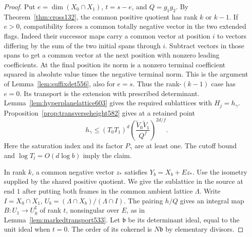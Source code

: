 \documentclass[a4paper,11pt]{article}
\theoremstyle{definition}
\theoremstyle{remark}
\numberwithin{equation}{section}
\begin{document}
\begin{proof}
Put \(e=\dim(X_0\cap X_1)\), \(t=s-e\), and \(Q=g_1g_2\).
By Theorem~\ref{thm:cross132}, the common positive quotient has
rank \(k\) or \(k-1\). If \(e>0\), compatibility forces a common
totally negative vector in the two extended flags. Indeed their
successor maps carry a common vector at position \(i\) to vectors
differing by the sum of the two initial spans through \(i\).
Subtract vectors in those spans to get a common vector at the next
position with nonzero leading coefficients. At the final position
its norm is a nonzero terminal coefficient squared in absolute value
times the negative terminal norm. This is the argument of
Lemma~\ref{lem:suffixdet556}, also for \(e=s\).
Thus the rank-\((k-1)\) case has \(e=0\). Its transport is the
extension with prescribed determinant. Lemma~\ref{lem:hyperplanelattice603}
gives the required sublattices with \(H_j=h_\gamma\).
Proposition~\ref{prop:transverseheight582} gives at a retained point
\[
     h_\gamma\le (T_0T_1)^d
          \left(\frac{\widetilde V_0\widetilde V_1}{Q^f}\right)^{2d/f}.
\]
Here the saturation index and its factor \(P_\gamma\) are at least
one. The cutoff bound and \(\log T_l=O(d\log b)\) imply the claim.

In rank \(k\), a common negative vector \(z_*\) satisfies
\(Y_b=X_b+Ez_*\). Use the isometry supplied by the shared
positive quotient. We give the sublattice in the source at end \(1\)
after putting both frames in the common ambient lattice \(\Lambda\).
Write \(I=X_0\cap X_1\),
\(U_b=(\Lambda\cap X_b)/(\Lambda\cap I)\).
The pairing \(h/Q\) gives an integral map
\(B:U_1\to U_0^\sharp\) of rank \(t\), nonsingular over \(E\), as
in Lemma~\ref{lem:markedtransport533}. Let \(\mathfrak b\) be
its determinant ideal, equal to the unit ideal when \(t=0\).
The order of its cokernel is \(N\mathfrak b\) by elementary divisors.


\end{proof}
\end{document}
